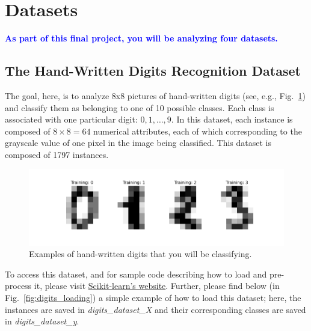 \documentclass[letterpaper]{article}
\begin{document}
\newpage


\section{Datasets}
\label{sec:datasets}

\textbf{\textcolor{blue}{As part of this final project, you will be analyzing four datasets.} }



\subsection{The Hand-Written Digits Recognition Dataset}
The goal, here, is to analyze 8x8 pictures of hand-written digits (see, e.g., Fig.~\ref{fig:digits}) and classify them as belonging to one of 10 possible classes. Each class is associated with one particular digit: $0, 1, \ldots, 9$. In this dataset, each instance is composed of $8 \times 8 = 64$ numerical attributes, each of which corresponding to the grayscale value of one pixel in the image being classified. This dataset is composed of 1797 instances.

\begin{figure}[!h]
	\centering
	\includegraphics[width=0.8\columnwidth]{figures/digits.png}
	\caption{Examples of hand-written digits that you will be classifying.}
	\label{fig:digits}
\end{figure}

To access this dataset, and for sample code describing how to load and pre-process it, please visit \href{https://scikit-learn.org/stable/auto_examples/classification/plot_digits_classification.html}{Scikit-learn's website}. Further, please find below (in Fig.~\ref{fig:digits_loading}) a simple example of how to load this dataset; here, the instances are saved in \textit{digits\_dataset\_X} and their corresponding classes are saved in \textit{digits\_dataset\_y}.
\end{document}
